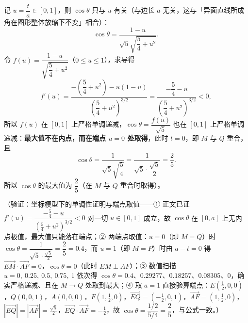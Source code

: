 \begin{answer}
记 \(u=\dfrac{t}{a}\in[0,1]\)，则 \(\cos\theta\) 只与 \(u\) 有关（与边长 \(a\) 无关，这与「异面直线所成角在图形整体放缩下不变」相合）：
\nopagebreak[4]
\[
\cos\theta=\dfrac{1-u}{\sqrt5\sqrt{\dfrac54+u^2}}.
\]
令 \(f(u)=\dfrac{1-u}{\sqrt{\dfrac54+u^2}}\)（\(0\leqslant u\leqslant1\)），求导得
\nopagebreak[4]
\[
f'(u)=\dfrac{-\left(\dfrac54+u^2\right)-u(1-u)}{\left(\dfrac54+u^2\right)^{3/2}}
=\dfrac{-\dfrac54-u}{\left(\dfrac54+u^2\right)^{3/2}}<0,
\]
所以 \(f(u)\) 在 \([0,1]\) 上严格单调递减，\(\cos\theta=\dfrac{f(u)}{\sqrt5}\) 也在 \([0,1]\) 上严格单调递减：\textbf{最大值不在内点，而在端点 \(u=0\) 处取得}，此时 \(t=0\)，即 \(M\) 与 \(Q\) 重合，且
\nopagebreak[4]
\[
\cos\theta=\dfrac{1}{\sqrt5\sqrt{\dfrac54}}=\dfrac{1}{\sqrt5\cdot\dfrac{\sqrt5}{2}}=\dfrac25.
\]
所以 \(\cos\theta\) 的最大值为 \(\dfrac25\)（在 \(M\) 与 \(Q\) 重合时取得）。

（验证：坐标模型下的单调性证明与端点取值——① 正文已证 \(f'(u)=\dfrac{-\frac54-u}{\left(\frac54+u^2\right)^{3/2}}<0\) 对一切 \(u\in[0,1]\) 成立，故 \(\cos\theta\) 在 \([0,a]\) 上无内点极值，最大值只能落在端点；② 两端点取值：\(u=0\)（即 \(M=Q\)）时 \(\cos\theta=\dfrac{1}{\sqrt5\cdot\frac{\sqrt5}{2}}=\dfrac25=0.4\)，而 \(u=1\)（即 \(M=P\)）时由 \(a-t=0\) 得 \(\overrightarrow{EM}\cdot\overrightarrow{AF}=0\)，\(\cos\theta=0\)（此时 \(EM\perp AF\)）；③ 数值扫描 \(u=0,\ 0.25,\ 0.5,\ 0.75,\ 1\) 依次得 \(\cos\theta=0.4\)、\(0.29277\)、\(0.18257\)、\(0.08305\)、\(0\)，确实严格递减、且在 \(M\to Q\) 处取到最大；④ 取 \(a=1\) 直接验算端点：\(E\left(\frac12,0,0\right)\)，\(Q(0,0,1)\)，\(A(0,0,0)\)，\(F\left(1,\frac12,0\right)\)，\(\overrightarrow{EQ}=\left(-\frac12,0,1\right)\)，\(\overrightarrow{AF}=\left(1,\frac12,0\right)\)，\(\left|\overrightarrow{EQ}\right|=\left|\overrightarrow{AF}\right|=\frac{\sqrt5}{2}\)，\(\overrightarrow{EQ}\cdot\overrightarrow{AF}=-\frac12\)，故 \(\cos\theta=\dfrac{1/2}{5/4}=\dfrac25\)，与公式一致。）


\end{answer}
